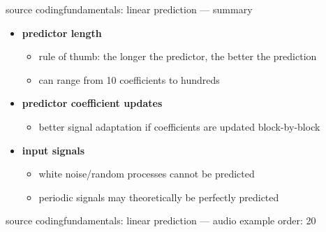 	\begin{frame}{source coding}{fundamentals: linear prediction --- summary}
		\begin{itemize}
			\item 	\textbf{predictor length}
				\begin{itemize}
					\item	rule of thumb: the longer the predictor, the better the prediction
					\item	can range from 10 coefficients to hundreds
				\end{itemize}
			\pause
            \bigskip
			\item	\textbf{predictor coefficient updates}
				\begin{itemize}
					\item	better signal adaptation if coefficients are updated block-by-block
				\end{itemize}
			\pause
            \bigskip
			\item	\textbf{input signals}
				\begin{itemize}
					\item	white noise/random processes cannot be predicted
					\item	periodic signals may theoretically be perfectly predicted
				\end{itemize}
		\end{itemize}
	\end{frame}
	\begin{frame}{source coding}{fundamentals: linear prediction --- audio example}
        order: 20
        \begin{columns}
                \vspace{6mm}
                
                
                \vspace{8mm}

                
                \vspace{8mm}

			\end{columns}
	\end{frame}

